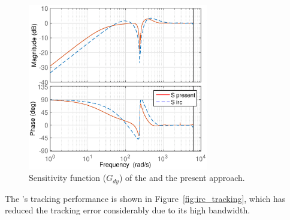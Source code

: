 \begin{figure}[h!]
  \centering
  \includegraphics[width=0.7\textwidth]{fig/matlab/sensitivity_irc.eps}
  \caption{\label{fig:sensitivity_irc}Sensitivity function ($G_{dy}$) of the \abbrIRC and the present approach.}
\end{figure}

The \abbrIRC's tracking performance is shown in Figure~\ref{fig:irc_tracking}, which has reduced the tracking error considerably due to its high bandwidth.

